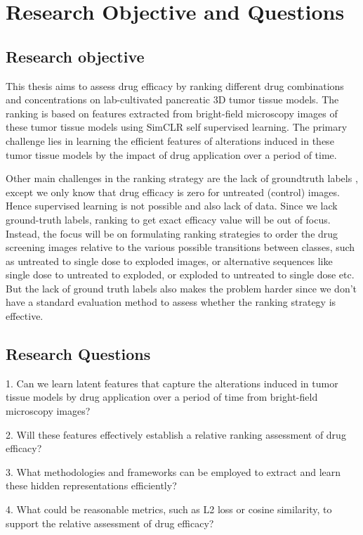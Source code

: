 \chapter{Research Objective and Questions}\label{ch:Research Objectives and Questions}
\section*{Research objective}
This thesis aims to assess drug efficacy by ranking different drug combinations and concentrations on lab-cultivated pancreatic 3D tumor tissue models. 
The ranking is based on features extracted from bright-field microscopy images of these tumor tissue models using
SimCLR self supervised learning. The primary challenge lies in learning the efficient features of alterations induced in these
tumor tissue models by the impact of drug application over a period of time.

Other main challenges in the ranking strategy are the lack of groundtruth labels , except we only know that drug efficacy is zero for untreated (control) images. Hence supervised learning is not possible and also lack of data. Since we lack ground-truth labels, ranking to get exact efficacy value will be out of focus. Instead, the focus will be on formulating ranking strategies to order the drug screening images relative to the various possible transitions between classes, such as untreated to single dose to exploded images, or alternative sequences like single dose to untreated to exploded, or exploded to untreated to single dose etc. But the lack of ground truth labels also makes the problem harder since we don't have a standard evaluation method to assess whether the ranking strategy is effective.
\section*{Research Questions}

1. Can we learn latent features that capture the alterations induced in tumor tissue models by drug application over a period of time from bright-field microscopy images?

2. Will these features effectively establish a relative ranking assessment of drug efficacy?

3. What methodologies and frameworks can be employed to extract and learn these hidden representations efficiently?

4. What could be reasonable metrics, such as L2 loss or cosine similarity, to support the relative assessment of drug efficacy?

